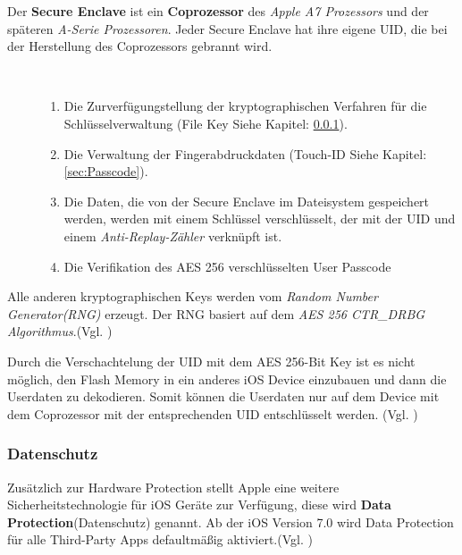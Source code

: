 Der \textbf{Secure Enclave} ist ein \textbf{Coprozessor} des \textit{\glqq Apple A7 Prozessors\grqq{}} und der späteren \textit{\glqq A-Serie Prozessoren\grqq}. Jeder Secure Enclave hat ihre eigene UID, die bei der Herstellung des Coprozessors gebrannt wird.

\newpage
\begin{description}
     \item[\parbox{\textwidth} {Die Secure Enclave hat folgende Aufgaben}]~\par
    \begin{enumerate}
        \item Die Zurverfügungstellung der kryptographischen Verfahren für die Schlüsselverwaltung (File Key Siehe Kapitel: \ref{sec:DataProtection}).
       \item Die Verwaltung der Fingerabdruckdaten (Touch-ID Siehe Kapitel: \ref{sec:Passcode}).
       \item Die Daten, die von der Secure Enclave im Dateisystem gespeichert werden, werden mit einem Schlüssel verschlüsselt, der mit der UID und einem \textit{\glqq Anti-Replay-Zähler\grqq{}} verknüpft ist.
       \item Die Verifikation des AES 256 verschlüsselten User Passcode
    \end{enumerate}   
\end{description} 

Alle anderen kryptographischen Keys werden vom \textit{\glqq Random Number Generator(RNG)\grqq{}} erzeugt. Der RNG basiert auf dem \textit{\glqq AES 256 CTR\_DRBG Algorithmus\grqq{}}.(Vgl. \cite{iOSSec[5], iOSSec[2],iOSSec[1], Apple[4], Apple[5], Apple[6], Apple[3]})

Durch die Verschachtelung der UID mit dem AES 256-Bit Key ist es nicht möglich, den Flash Memory in ein anderes iOS Device einzubauen und dann die Userdaten zu dekodieren. Somit können die Userdaten nur auf dem Device mit dem Coprozessor mit der entsprechenden UID entschlüsselt werden. (Vgl. \cite{iOSSec[5], iOSSec[2],iOSSec[1], Apple[4], Apple[5], Apple[6], Apple[3]})

\subsubsection{Datenschutz}
\label{sec:DataProtection}

Zusätzlich zur Hardware Protection stellt Apple eine weitere Sicherheitstechnologie für iOS Geräte zur Verfügung, diese wird \textbf{Data Protection}(Datenschutz) genannt. Ab der iOS Version 7.0 wird Data Protection für alle Third-Party Apps defaultmäßig aktiviert.(Vgl. \cite{iOSSec[5], iOSSec[2],iOSSec[1], Apple[4], Apple[5], Apple[6], Apple[3]})

